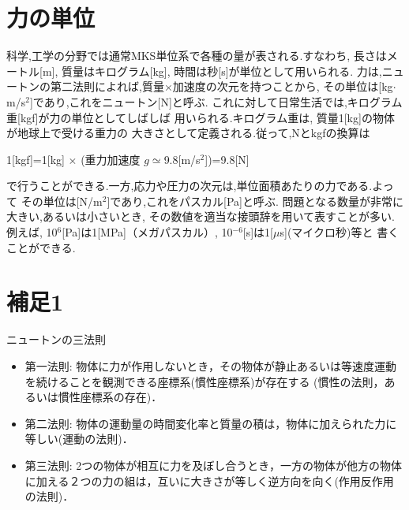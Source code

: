 \documentclass[10pt,a4j]{jbook}
\begin{document}
\section{力の単位}
科学,工学の分野では通常MKS単位系で各種の量が表される.すなわち, 
長さはメートル[m], 質量はキログラム[kg], 時間は秒[s]が単位として用いられる.
力は,ニュートンの第二法則によれば,質量×加速度の次元を持つことから, 
その単位は[kg$\cdot$m/s$^2$]であり,これをニュートン[N]と呼ぶ.
これに対して日常生活では,キログラム重[kgf]が力の単位としてしばしば
用いられる.キログラム重は, 質量1[kg]の物体が地球上で受ける重力の
大きさとして定義される.従って,Nとkgfの換算は
\begin{center}
	1[kgf]=1[kg] $\times$ (重力加速度  $g\simeq$9.8[m/s$^2$])=9.8[N]
\end{center}
で行うことができる.一方,応力や圧力の次元は,単位面積あたりの力である.よって
その単位は[N/m$^2$]であり,これをパスカル[Pa]と呼ぶ.
問題となる数量が非常に大きい,あるいは小さいとき,
その数値を適当な接頭辞を用いて表すことが多い.例えば,
10$^6$[Pa]は1[MPa]（メガパスカル）, 10$^{-6}$[s]は1[$\mu$s](マイクロ秒)等と
書くことができる.
\clearpage
\section{補足1}
ニュートンの三法則
\begin{itemize}
\item
第一法則:
物体に力が作用しないとき，その物体が静止あるいは等速度運動を続けることを観測できる座標系(慣性座標系)が存在する
		(慣性の法則，あるいは慣性座標系の存在)．
\item
第二法則:
物体の運動量の時間変化率と質量の積は，物体に加えられた力に等しい(運動の法則)．
\item
第三法則:
2つの物体が相互に力を及ぼし合うとき，一方の物体が他方の物体に加える２つの力の組は，互いに大きさが等しく逆方向を向く(作用反作用の法則)．
\end{itemize}
\end{document}
